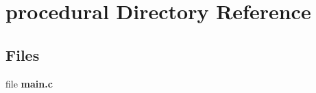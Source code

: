 \section{procedural Directory Reference}
\label{dir_91f4af2579860822daa00faae424a3b0}
\subsection*{Files}
\begin{DoxyCompactItemize}
\item 
file {\bf main.\+c}
\end{DoxyCompactItemize}
